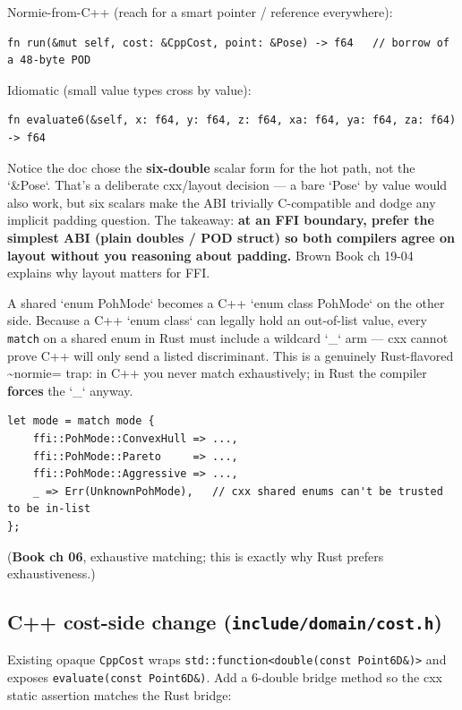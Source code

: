 \documentclass[11pt]{article}
\begin{document}
Normie-from-C++ (reach for a smart pointer / reference everywhere):

\begin{verbatim}
fn run(&mut self, cost: &CppCost, point: &Pose) -> f64   // borrow of a 48-byte POD
\end{verbatim}

Idiomatic (small value types cross by value):

\begin{verbatim}
fn evaluate6(&self, x: f64, y: f64, z: f64, xa: f64, ya: f64, za: f64) -> f64
\end{verbatim}

Notice the doc chose the \textbf{six-double} scalar form for the hot path, not the
`\&Pose`. That's a deliberate cxx/layout decision — a bare `Pose` by value
would also work, but six scalars make the ABI trivially C-compatible and dodge
any implicit padding question. The takeaway: \textbf{\textbf{at an FFI boundary, prefer the
simplest ABI (plain doubles / POD struct) so both compilers agree on layout
without you reasoning about padding.}} Brown Book ch 19-04 explains why layout
matters for FFI.

A shared `enum PohMode` becomes a C++ `enum class PohMode` on the other side.
Because a C++ `enum class` can legally hold an out-of-list value, every \texttt{match}
on a shared enum in Rust must include a wildcard `\_` arm — cxx cannot prove
C++ will only send a listed discriminant. This is a genuinely Rust-flavored
\textasciitilde{}normie= trap: in C++ you never match exhaustively; in Rust the compiler
\textbf{forces} the `\_` anyway.

\begin{verbatim}
let mode = match mode {
    ffi::PohMode::ConvexHull => ...,
    ffi::PohMode::Pareto     => ...,
    ffi::PohMode::Aggressive => ...,
    _ => Err(UnknownPohMode),   // cxx shared enums can't be trusted to be in-list
};
\end{verbatim}

(\textbf{\textbf{Book ch 06}}, exhaustive matching; this is exactly why Rust prefers exhaustiveness.)
\subsection{C++ cost-side change (\texttt{include/domain/cost.h})}
\label{sec:org5c8ead3}

Existing opaque \texttt{CppCost} wraps \texttt{std::function<double(const Point6D\&)>} and
exposes \texttt{evaluate(const Point6D\&)}. Add a 6-double bridge method so the cxx static assertion matches the Rust bridge:
\end{document}
